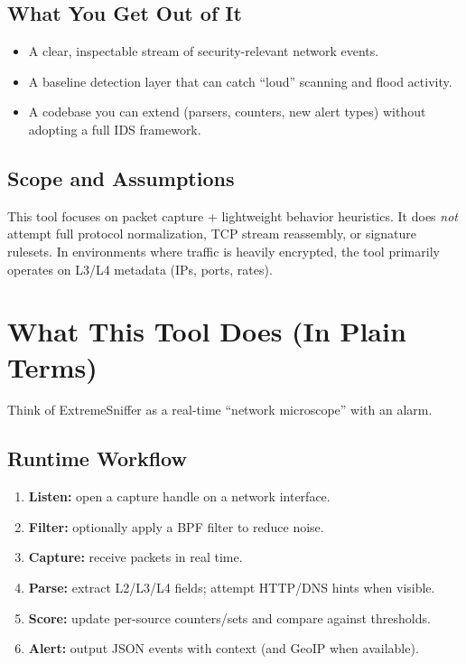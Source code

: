 \documentclass[14pt]{extarticle}
\begin{document}
\subsection{What You Get Out of It}
\begin{itemize}
  \item A clear, inspectable stream of security-relevant network events.
  \item A baseline detection layer that can catch ``loud'' scanning and flood activity.
  \item A codebase you can extend (parsers, counters, new alert types) without adopting a full IDS framework.
\end{itemize}

\subsection{Scope and Assumptions}
This tool focuses on packet capture + lightweight behavior heuristics. It does \emph{not} attempt full protocol normalization, TCP stream reassembly, or signature rulesets. In environments where traffic is heavily encrypted, the tool primarily operates on L3/L4 metadata (IPs, ports, rates).

\section{What This Tool Does (In Plain Terms)}
Think of ExtremeSniffer as a real-time ``network microscope'' with an alarm.

\subsection{Runtime Workflow}
\begin{enumerate}
  \item \textbf{Listen:} open a capture handle on a network interface.
  \item \textbf{Filter:} optionally apply a BPF filter to reduce noise.
  \item \textbf{Capture:} receive packets in real time.
  \item \textbf{Parse:} extract L2/L3/L4 fields; attempt HTTP/DNS hints when visible.
  \item \textbf{Score:} update per-source counters/sets and compare against thresholds.
  \item \textbf{Alert:} output JSON events with context (and GeoIP when available).
\end{enumerate}
\end{document}
